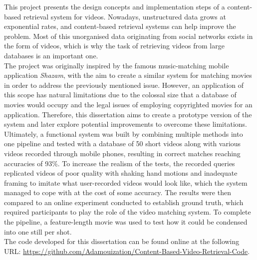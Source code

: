 This project presents the design concepts and implementation steps of a content-based retrieval system for videos. Nowadays, unstructured data grows at exponential rates, and content-based retrieval systems can help improve the problem. Most of this unorganised data originating from social networks exists in the form of videos, which is why the task of retrieving videos from large databases is an important one.\\

The project was originally inspired by the famous music-matching mobile application \textit{Shazam}, with the aim to create a similar system for matching movies in order to address the previously mentioned issue. However, an application of this scope has natural limitations due to the colossal size that a database of movies would occupy and the legal issues of employing copyrighted movies for an application. Therefore, this dissertation aims to create a prototype version of the system and later explore potential improvements to overcome these limitations.\\

Ultimately, a functional system was built by combining multiple methods into one pipeline and tested with a database of 50 short videos along with various videos recorded through mobile phones, resulting in correct matches reaching accuracies of 93\%. To increase the realism of the tests, the recorded queries replicated videos of poor quality with shaking hand motions and inadequate framing to imitate what user-recorded videos would look like, which the system managed to cope with at the cost of some accuracy. The results were then compared to an online experiment conducted to establish ground truth, which required participants to play the role of the video matching system. To complete the pipeline, a feature-length movie was used to test how it could be condensed into one still per shot.\\

The code developed for this dissertation can be found online at the following URL: \url{https://github.com/Adamouization/Content-Based-Video-Retrieval-Code}.
